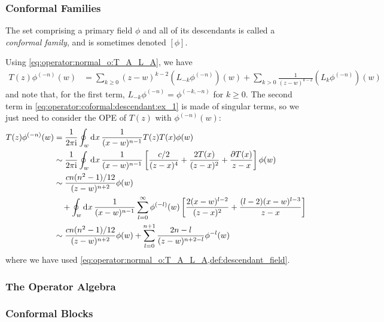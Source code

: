\documentclass[10pt]{article}
\newcommand{\ii}{\mathrm{i}}
\begin{document}
\subsubsection{Conformal Families}
\begin{definition}
    The set comprising a primary field $\phi$ and all of its descendants is called a \textit{conformal family}, and is sometimes denoted $[\phi]$.
\end{definition}
\begin{example}
    Using \cref{eq:operator:normal_o:T_A_L_A}, we have 
    \begin{align}\label{eq:operator:coformal:descendant:ex_1}
        T(z)\phi^{(-n)}(w)&=\sum_{k\geq0}(z-w)^{k-2}\left(L_{-k}\phi^{(-n)}\right)(w)+\sum_{k>0}\frac{1}{(z-w)^{k-2}}\left(L_{k}\phi^{(-n)}\right)(w)
    \end{align}
    and note that, for the first term, $L_{-k}\phi^{(-n)}=\phi^{(-k,-n)}$ for $k\geq0$.
    The second term in \cref{eq:operator:coformal:descendant:ex_1} is made of singular terms, so we just need to consider the OPE of $T(z)$ with $\phi^{(-n)}(w)$:
    \begin{align}
        T(z)\phi^{(-n)}(w)&=\frac{1}{2\pi\ii}\oint_w\dd[]{x}\frac{1}{(x-w)^{n-1}}T(z)T(x)\phi(w)\notag\\
                          &\sim\frac{1}{2\pi\ii}\oint_w\dd[]{x}\frac{1}{(x-w)^{n-1}}\left[\frac{c/2}{(z-x)^4}+\frac{2T(x)}{(z-x)^2}+\frac{\partial T(x)}{z-x}\right]\phi(w)\notag\\
                          &\sim\frac{cn(n^2-1)/12}{(z-w)^{n+2}}\phi(w)\notag\\
                          &\quad+\oint_w\dd[]{x}\frac{1}{(x-w)^{n-1}}\sum_{l=0}^\infty\phi^{(-l)}(w)\left[\frac{2(x-w)^{l-2}}{(z-x)^2}+\frac{(l-2)(x-w)^{l-3}}{z-x}\right]\notag\\
                          &\sim\frac{cn(n^2-1)/12}{(z-w)^{n+2}}\phi(w)+\sum_{l=0}^{n+1}\frac{2n-l}{(z-w)^{n+2-l}}\phi^{-l}(w)
    \end{align}
    where we have used \cref{eq:operator:normal_o:T_A_L_A,def:descendant_field}.
\end{example}
\subsubsection{The Operator Algebra}
\subsubsection{Conformal Blocks}
\end{document}
